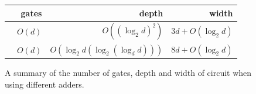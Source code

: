 \documentclass[notitlepage]{article}
\theoremstyle{definition}
\begin{document}
\begin{figure}
    \centering
    \begin{tabular}{lrrr}
        \toprule
                                    & gates      & depth & width\\
        \midrule
        \cite{cuccaro2004new}       & $O(d)$    & $O\left({(\log_{2}d)}^{2}\right)$ & $3d + O(\log_{2}d)$\\ %
        \cite{Takahashi:2008:FQC}   & $O(d)$    & $O\left(\log_{2}d\left(\log_{2}(\log_{d}d)\right)\right)$ & $8d + O(\log_{2}d)$\\ %
        \bottomrule
    \end{tabular}
    \caption{A summary of the number of gates, depth and width of circuit when using different adders.}\label{tab:GDW}
\end{figure}



\end{document}
